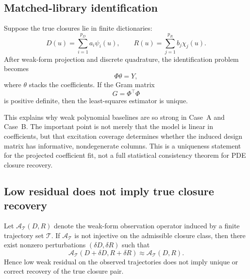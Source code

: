 \subsection{Matched-library identification}

\begin{proposition}
Suppose the true closures lie in finite dictionaries:
\begin{equation}
D(u) = \sum_{i=1}^{p_D} a_i \psi_i(u),
\qquad
R(u) = \sum_{j=1}^{p_R} b_j \chi_j(u).
\end{equation}
After weak-form projection and discrete quadrature, the identification problem becomes
\begin{equation}
\Phi \theta = Y,
\end{equation}
where $\theta$ stacks the coefficients. If the Gram matrix
\begin{equation}
G = \Phi^\top \Phi
\end{equation}
is positive definite, then the least-squares estimator is unique.
\end{proposition}

This explains why weak polynomial baselines are so strong in Case~A and Case~B. The important point is not merely that the model is linear in coefficients, but that excitation coverage determines whether the induced design matrix has informative, nondegenerate columns. This is a uniqueness statement for the projected coefficient fit, not a full statistical consistency theorem for PDE closure recovery.

\subsection{Low residual does not imply true closure recovery}

\begin{proposition}
\label{prop:non_identifiability}
Let $\mathcal{A}_{\mathcal{T}}(D,R)$ denote the weak-form observation operator induced by a finite trajectory set $\mathcal{T}$. If $\mathcal{A}_{\mathcal{T}}$ is not injective on the admissible closure class, then there exist nonzero perturbations $(\delta D,\delta R)$ such that
\begin{equation}
\mathcal{A}_{\mathcal{T}}(D+\delta D,R+\delta R)
\approx
\mathcal{A}_{\mathcal{T}}(D,R).
\end{equation}
Hence low weak residual on the observed trajectories does not imply unique or correct recovery of the true closure pair.
\end{proposition}

